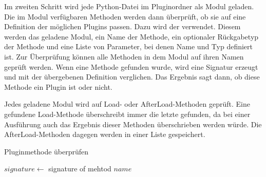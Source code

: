 Im zweiten Schritt wird jede Python-Datei im Pluginordner als Modul geladen.
Die im Modul verfügbaren Methoden werden dann überprüft, ob sie auf eine Definition der möglichen Plugins passen.
Dazu wird der  verwendet.
Diesem werden das geladene Modul, ein Name der Methode, ein optionaler Rückgabetyp der Methode und eine Liste von Parameter, bei denen Name und Typ definiert ist.
Zur Überprüfung können alle Methoden in dem Modul auf ihren Namen geprüft werden.
Wenn eine Methode gefunden wurde, wird eine Signatur erzeugt und mit der übergebenen Definition verglichen.
Das Ergebnis sagt dann, ob diese Methode ein Plugin ist oder nicht.

Jedes geladene Modul wird auf Load- oder AfterLoad-Methoden geprüft.
Eine gefundene Load-Methode überschreibt immer die letzte gefunden, da bei einer Ausführung auch das Ergebnis dieser Methoden überschrieben werden würde.
Die AfterLoad-Methoden dagegen werden in einer Liste gespeichert.


\begin{algorithm}
    \caption{Pluginmethode überprüfen}
    \label{algo:check-method}




    $signature \gets$ signature of mehtod $name$




\end{algorithm}

